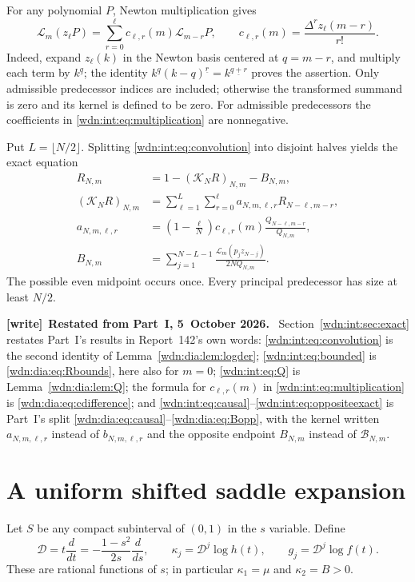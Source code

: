 \documentclass[11pt,letterpaper]{article}
\theoremstyle{remark}\newtheorem{remark}[theorem]{Remark}
\newcommand{\LL}{\mathcal L}
\newcommand{\fall}[2]{#1^{\underline{#2}}}
\newcommand{\dd}{\mathcal D}
\newenvironment{writenote}[1][]{\par\smallskip\begingroup\small
 \noindent\textbf{[write]}\if\relax\detokenize{#1}\relax\else~\textbf{#1.}\fi\ }%
 {\par\endgroup\smallskip}
\begin{document}
For any polynomial $P$, Newton multiplication gives
\begin{equation}\label{wdn:int:eq:multiplication}
 \LL_m(z_\ell P)=\sum_{r=0}^{\ell}c_{\ell,r}(m)\LL_{m-r}P,
 \qquad c_{\ell,r}(m)=\frac{\Delta^r z_\ell(m-r)}{r!}.
\end{equation}
Indeed, expand $z_\ell(k)$ in the Newton basis centered at $q=m-r$,
and multiply each term by $\fall{k}{q}$; the identity
$\fall{k}{q}\fall{(k-q)}{r}=\fall{k}{q+r}$ proves the assertion.
Only admissible predecessor indices are included; otherwise the
transformed summand is zero and its kernel is defined to be zero.
For admissible predecessors the coefficients in \eqref{wdn:int:eq:multiplication}
are nonnegative.

Put $L=\lfloor N/2\rfloor$. Splitting \eqref{wdn:int:eq:convolution} into
disjoint halves yields the exact equation
\begin{align}
 R_{N,m}&=1-(\mathcal K_NR)_{N,m}-B_{N,m},\label{wdn:int:eq:causal}\\
 (\mathcal K_NR)_{N,m}
 &=\sum_{\ell=1}^{L}\sum_{r=0}^{\ell}
       a_{N,m,\ell,r}R_{N-\ell,m-r},\label{wdn:int:eq:exactkernel}\\
 a_{N,m,\ell,r}
 &=\left(1-\frac\ell N\right)c_{\ell,r}(m)
                 \frac{Q_{N-\ell,m-r}}{Q_{N,m}},\label{wdn:int:eq:kerneldef}\\
 B_{N,m}&=\sum_{j=1}^{N-L-1}
                   \frac{\LL_m(p_jz_{N-j})}{2NQ_{N,m}}.\label{wdn:int:eq:oppositeexact}
\end{align}
The possible even midpoint occurs once. Every principal predecessor has
size at least $N/2$.

\begin{writenote}[Restated from Part~I, 5~October 2026]
Section~\ref{wdn:int:sec:exact} restates Part~I's results in Report~142's own words: \eqref{wdn:int:eq:convolution} is the second identity of Lemma~\ref{wdn:dia:lem:logder}; \eqref{wdn:int:eq:bounded} is \eqref{wdn:dia:eq:Rbounds}, here also for $m=0$; \eqref{wdn:int:eq:Q} is Lemma~\ref{wdn:dia:lem:Q}; the formula for $c_{\ell,r}(m)$ in \eqref{wdn:int:eq:multiplication} is \eqref{wdn:dia:eq:cdifference}; and \eqref{wdn:int:eq:causal}--\eqref{wdn:int:eq:oppositeexact} is Part~I's split \eqref{wdn:dia:eq:causal}--\eqref{wdn:dia:eq:Bopp}, with the kernel written $a_{N,m,\ell,r}$ instead of $b_{N,m,\ell,r}$ and the opposite endpoint $B_{N,m}$ instead of $\mathcal B_{N,m}$.
\end{writenote}

\section{A uniform shifted saddle expansion}\label{wdn:int:sec:saddle}
Let $S$ be any compact subinterval of $(0,1)$ in the $s$ variable. Define
\begin{equation}\label{wdn:int:eq:cumulants}
 \dd=t\frac d{dt}=-\frac{1-s^2}{2s}\frac d{ds},\qquad
 \kappa_j=\dd^j\log h(t),\qquad g_j=\dd^j\log f(t).
\end{equation}
These are rational functions of $s$; in particular $\kappa_1=\mu$ and
$\kappa_2=B>0$.
\end{document}
